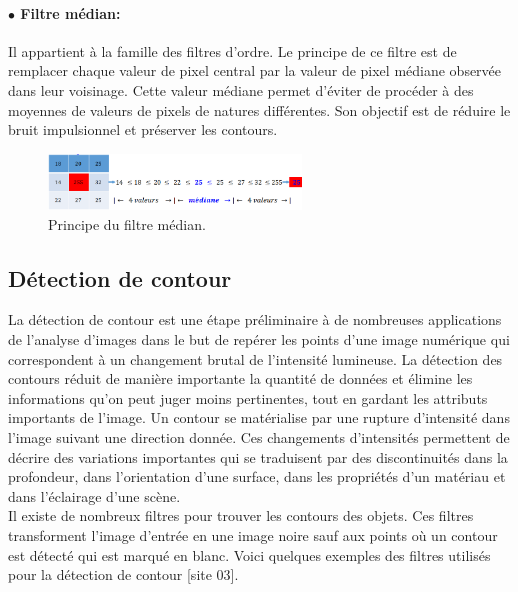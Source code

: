 \paragraph{ $\bullet$ Filtre médian:}
Il appartient à la famille des filtres d’ordre. Le principe de ce filtre est de remplacer chaque valeur de pixel central par la valeur de pixel médiane observée dans leur voisinage. Cette valeur médiane permet d’éviter de procéder à des moyennes de valeurs de pixels de natures différentes. Son objectif est de réduire le bruit impulsionnel et préserver les contours.
\begin{figure}[H]
	\centering
	\includegraphics[width=0.6\textwidth]{Figures/median} 
	\caption{Principe du filtre médian.}
\end{figure}

\subsection{Détection de contour}
La détection de contour est une étape préliminaire à de nombreuses
applications de l'analyse d'images dans le but de repérer les points d’une
image numérique qui correspondent à un changement brutal de l’intensité
lumineuse. La détection des contours réduit de manière importante la
quantité de données et élimine les informations qu'on peut juger moins
pertinentes, tout en gardant les attributs importants de l'image.
Un contour se matérialise par une rupture d'intensité dans l'image
suivant une direction donnée. Ces changements d’intensités permettent de
décrire des variations importantes qui se traduisent par des discontinuités
dans la profondeur, dans l'orientation d'une surface, dans les propriétés
d'un matériau et dans l'éclairage d'une scène.\\

Il existe de nombreux filtres pour trouver les contours des objets. Ces filtres transforment l'image d'entrée en une image noire sauf aux points où un
contour est détecté qui est marqué en blanc. Voici quelques exemples des filtres utilisés pour la détection de contour [site 03].

